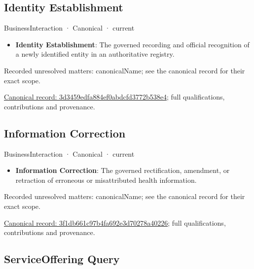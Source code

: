 \subsection{Identity Establishment}

\label{element:3d3459edfa884ef0abdcfd3772b538e4}
{\small BusinessInteraction · Canonical · current}\par

\begin{itemize}


\item \textbf{Identity Establishment}: The governed recording and official recognition of a newly identified entity in an authoritative registry.

\end{itemize}

{\small Recorded unresolved matters: canonicalName; see the canonical record for their exact scope.}\par
{\footnotesize \href{../../../../continuum/business/business-interaction/3d3459edfa884ef0abdcfd3772b538e4.md}{Canonical record: 3d3459edfa884ef0abdcfd3772b538e4}; full qualifications, contributions and provenance.}\par
\subsection{Information Correction}

\label{element:3f1db661c97b4fa692e3d70278a40226}
{\small BusinessInteraction · Canonical · current}\par

\begin{itemize}


\item \textbf{Information Correction}: The governed rectification, amendment, or retraction of erroneous or misattributed health information.

\end{itemize}

{\small Recorded unresolved matters: canonicalName; see the canonical record for their exact scope.}\par
{\footnotesize \href{../../../../continuum/business/business-interaction/3f1db661c97b4fa692e3d70278a40226.md}{Canonical record: 3f1db661c97b4fa692e3d70278a40226}; full qualifications, contributions and provenance.}\par
\subsection{ServiceOffering Query}

